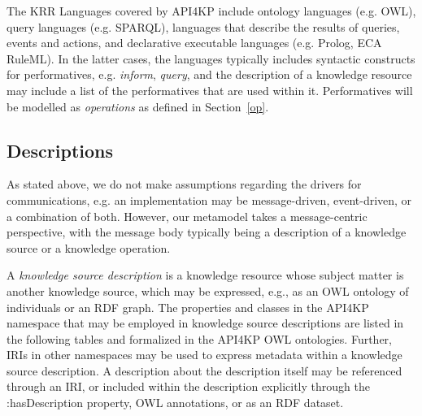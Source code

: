 \documentclass[runningheads]{llncs}
\begin{document}
The KRR Languages covered by API4KP include ontology languages (e.g. OWL), query languages (e.g. SPARQL), languages that describe the results of queries, events and actions, and declarative executable languages (e.g. Prolog, ECA RuleML). In the latter cases, the languages typically includes syntactic constructs for performatives, e.g. \emph{inform}, \emph{query}, and the description of a knowledge resource may include a list of the performatives that are used within it.  Performatives will be modelled as \emph{operations} as defined in Section~\ref{op}.




\subsection{Descriptions}
As stated above, we do not make assumptions regarding the drivers for communications, e.g. an implementation may be message-driven, event-driven, or a combination of both. However, our metamodel takes a message-centric perspective, with the message body typically being a description of a knowledge source or a knowledge operation.

A \emph{knowledge source description} is a knowledge resource whose subject matter is another knowledge source, which may be expressed, e.g., as an OWL ontology of individuals or an RDF graph. The properties and classes in the API4KP namespace that may be employed in knowledge source descriptions are listed in the following tables and formalized in the API4KP OWL ontologies. Further, IRIs in other namespaces may be used to express metadata within a knowledge source description. A description about the description itself may be referenced through an IRI, or included within the description explicitly through the :hasDescription property,  OWL annotations, or as an RDF dataset. 
\end{document}
